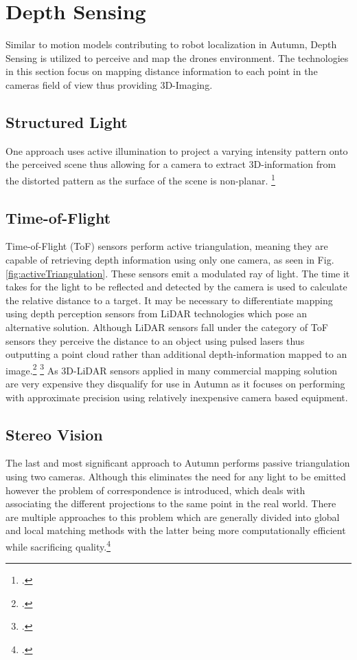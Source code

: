 \section{Depth Sensing}
Similar to motion models contributing to robot localization in Autumn, Depth Sensing is utilized to perceive and map the drones environment. 
The technologies in this section focus on mapping distance information to each point in the cameras field of view thus providing 3D-Imaging.

\subsection{Structured Light}
One approach uses active illumination to project a varying intensity pattern onto the perceived scene thus allowing for a camera to extract 3D-information from the distorted pattern as the surface of the scene is non-planar. \footcite{geng2011StructuredLight}

\subsection{Time-of-Flight}
Time-of-Flight (ToF) sensors perform active triangulation, meaning they are capable of retrieving depth information using only one camera, as seen in Fig. \ref{fig:activeTriangulation}. These sensors emit a modulated ray of light. The time it takes for the light to be reflected and detected by the camera is used to calculate the relative distance to a target. 
It may be necessary to differentiate mapping using depth perception sensors from LiDAR technologies which pose an alternative solution. 
Although LiDAR sensors fall under the category of ToF sensors they perceive the distance to an object using pulsed lasers thus outputting a point cloud rather than additional depth-information mapped to an image.\footcite{gokturk2004time} \footcite{velodyne2021LiDAR}
As 3D-LiDAR sensors applied in many commercial mapping solution are very expensive they disqualify for use in Autumn as it focuses on performing with approximate precision using relatively inexpensive camera based equipment. 

\subsection{Stereo Vision}
The last and most significant approach to Autumn performs passive triangulation using two cameras. Although this eliminates the need for any light to be emitted however the problem of correspondence is introduced, which deals with associating the different projections to the same point in the real world. There are multiple approaches to this problem which are generally divided into global and local matching methods with the latter being more computationally efficient while sacrificing quality.\footcite{do2019review}

